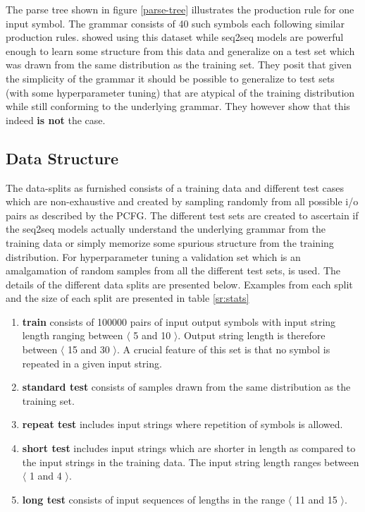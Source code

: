 The parse tree shown in figure \ref{parse-tree} illustrates the production rule for one input symbol. The grammar consists of 40 such symbols each following similar production rules. \cite{Weber2018} showed using this dataset while seq2seq models are powerful enough to learn some structure from this data and generalize on a test set which was drawn from the same distribution as the training set. They posit that given the simplicity of the grammar it should be possible to generalize to test sets (with some hyperparameter tuning) that are atypical of the training distribution while still conforming to the underlying grammar. They however show that this indeed \textbf{is not} the case.

\subsection{Data Structure}
The data-splits as furnished \citep{Weber2018} consists of a training data and different test cases which are non-exhaustive and created by sampling randomly from all possible i/o pairs as described by the PCFG. The different test sets are created to ascertain if the seq2seq models actually understand the underlying grammar from the training data or simply memorize some spurious structure from the training distribution. For hyperparameter tuning a validation set which is an amalgamation of random samples from all the different test sets, is used. The details of the different data splits are presented below. Examples from each split and the size of each split are presented in table \ref{sr:stats}
\begin{enumerate}
	\item \textbf{train} consists of 100000 pairs of input output symbols with input string length ranging between $\langle$ 5 and 10 $\rangle$. Output string length is therefore between $\langle$ 15 and 30 $\rangle$. A crucial feature of this set is that no symbol is repeated in a given input string.
	\item \textbf{standard test} consists of samples drawn from the same distribution as the training set.
	\item \textbf{repeat test} includes input strings where repetition of symbols is allowed.
	\item \textbf{short test} includes input strings which are shorter in length as compared to the input strings in the training data. The input string length ranges between $\langle$ 1 and 4 $\rangle$.
	\item \textbf{long test} consists of input sequences of lengths in the range $\langle$ 11 and 15 $\rangle$.
\end{enumerate}

